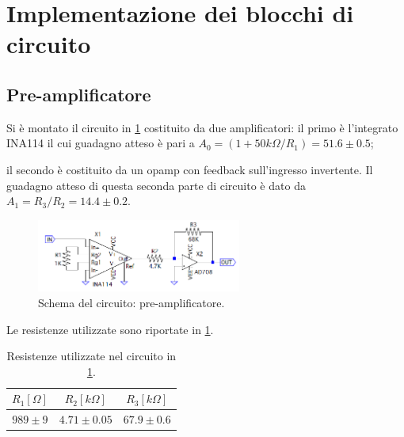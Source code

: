 \documentclass[a4paper,10pt]{article}
\begin{document}
\lipsum[1-2]

\pagebreak

\section{Implementazione dei blocchi di circuito}

\subsection{Pre-amplificatore}

Si è montato il circuito in \cref{fig:preamp} costituito da due amplificatori: il primo è l'integrato INA114 il cui guadagno atteso è pari a $A_0 = (1+ 50k\Omega/R_1) = 51.6 \pm 0.5$; %



 il secondo è costituito da un opamp con feedback sull'ingresso invertente. Il guadagno atteso di questa seconda parte di circuito è dato da $A_1 = R_3/R_2 = 14.4 \pm 0.2 $.

\begin{figure}
	\vspace{-10pt}
	\centering
	\includegraphics[width=0.6\textwidth]{../grafici/PreAmp.png}
	\vspace{-12pt}
	\caption{Schema del circuito: pre-amplificatore.}
	\label{fig:preamp}
	\vspace{-6pt}
\end{figure}

\lipsum[2-3]


Le resistenze utilizzate sono riportate in \cref{tab:resistenze}.

\begin{table}[H]
	\centering
	\begin{tabular}{ccc}
		\hline
		$R_1[\Omega]$ & $R_2[k\Omega]$ & $R_3[k\Omega]$\\
		\hline
		$989\pm9$ & $4.71\pm0.05$ & $67.9\pm0.6$\\
		\hline
	\end{tabular}
	\caption{Resistenze utilizzate nel circuito in \cref{fig:preamp}.}
	\label{tab:resistenze}
\end{table}
\end{document}
